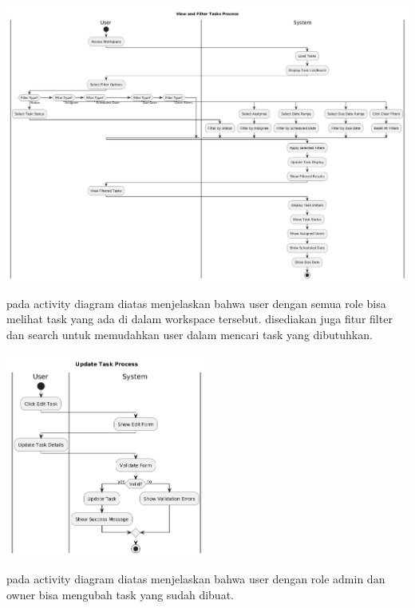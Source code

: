 \begin{center}
    \includegraphics[width=1\textwidth]{assets/activity_diagrams/task_read.png}
\end{center}
pada activity diagram diatas menjelaskan bahwa user dengan semua role bisa melihat task yang ada di dalam workspace tersebut.
disediakan juga fitur filter dan search untuk memudahkan user dalam mencari task yang dibutuhkan.

\begin{center}
    \includegraphics[width=0.5\textwidth]{assets/activity_diagrams/task_update.png}
\end{center}
pada activity diagram diatas menjelaskan bahwa user dengan role admin dan owner bisa mengubah task yang sudah dibuat.

